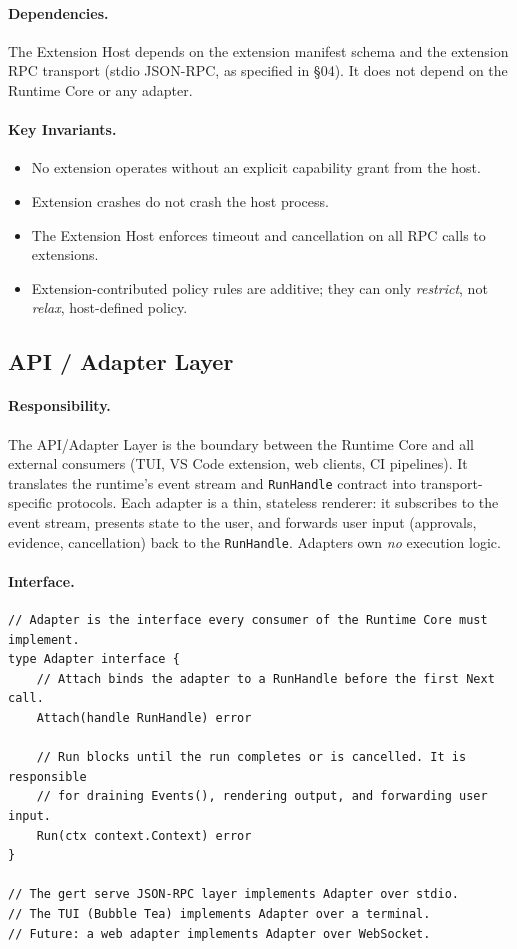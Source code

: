 \paragraph{Dependencies.}
The Extension Host depends on the extension manifest schema and the extension RPC transport
(stdio JSON-RPC, as specified in §04). It does not depend on the Runtime Core or any adapter.

\paragraph{Key Invariants.}
\begin{itemize}
  \item No extension operates without an explicit capability grant from the host.
  \item Extension crashes do not crash the host process.
  \item The Extension Host enforces timeout and cancellation on all RPC calls to extensions.
  \item Extension-contributed policy rules are additive; they can only \emph{restrict}, not
        \emph{relax}, host-defined policy.
\end{itemize}

\subsection{API / Adapter Layer}

\paragraph{Responsibility.}
The API/Adapter Layer is the boundary between the Runtime Core and all external consumers
(TUI, VS Code extension, web clients, CI pipelines). It translates the runtime's event stream
and \texttt{RunHandle} contract into transport-specific protocols. Each adapter is a thin,
stateless renderer: it subscribes to the event stream, presents state to the user, and forwards
user input (approvals, evidence, cancellation) back to the \texttt{RunHandle}. Adapters own
\emph{no} execution logic.

\paragraph{Interface.}

\begin{verbatim}
// Adapter is the interface every consumer of the Runtime Core must implement.
type Adapter interface {
    // Attach binds the adapter to a RunHandle before the first Next call.
    Attach(handle RunHandle) error

    // Run blocks until the run completes or is cancelled. It is responsible
    // for draining Events(), rendering output, and forwarding user input.
    Run(ctx context.Context) error
}

// The gert serve JSON-RPC layer implements Adapter over stdio.
// The TUI (Bubble Tea) implements Adapter over a terminal.
// Future: a web adapter implements Adapter over WebSocket.
\end{verbatim}

